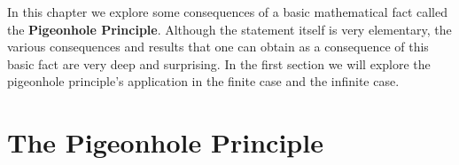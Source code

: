 In this chapter we explore some consequences of a basic mathematical fact called the \textbf{Pigeonhole Principle}. Although the statement itself is very elementary, the various consequences and results that one can obtain as a consequence of this basic fact are very deep and surprising. In the first section we will explore the pigeonhole principle's application in the finite case and the infinite case.

\section{The Pigeonhole Principle}

